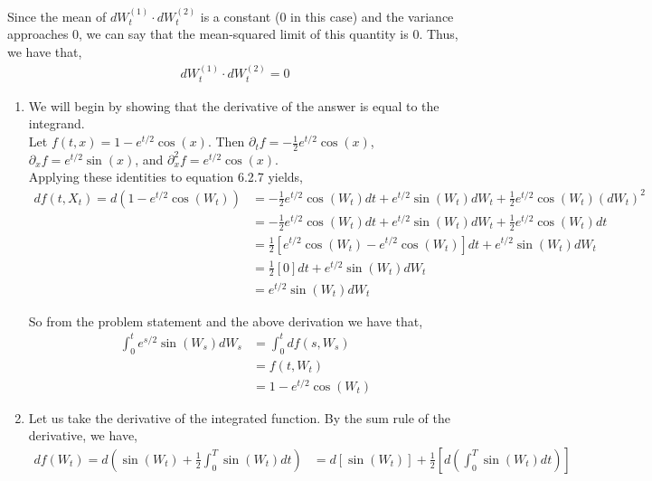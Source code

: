 \documentclass[12pt]{article}
\newenvironment{problem}[2][Problem]{\begin{trivlist}
\item[\hskip \labelsep {\bfseries #1}\hskip \labelsep {\bfseries #2.}]}{\end{trivlist}}
\begin{document}
Since the mean of $dW_t^{(1)} \cdot dW_t^{(2)}$ is a constant (0 in this case) and the variance approaches 0, we can say that the mean-squared limit of this quantity is 0. Thus, we have that,
\begin{align*}
dW_t^{(1)} \cdot dW_t^{(2)} = 0
\end{align*}

\begin{problem}{22}
\end{problem}

\begin{problem}{23}
\end{problem}

\begin{enumerate}[\alph*)]

\item We will begin by showing that the derivative of the answer is equal to the integrand.\\

Let $f(t,x) = 1 - e^{t/2}\cos(x)$. Then $\partial_t f = -\frac{1}{2}e^{t/2}\cos(x)$, $\partial_x f = e^{t/2}\sin(x)$, and $\partial^2_x f = e^{t/2}\cos(x)$.\\

Applying these identities to equation 6.2.7 yields,
\begin{align*}
df(t, X_t) = d(1 - e^{t/2}\cos(W_t)) &= -\frac{1}{2}e^{t/2}\cos(W_t)dt + e^{t/2}\sin(W_t)dW_t + \frac{1}{2}e^{t/2}\cos(W_t)(dW_t)^2\\
&= -\frac{1}{2}e^{t/2}\cos(W_t)dt + e^{t/2}\sin(W_t)dW_t + \frac{1}{2}e^{t/2}\cos(W_t)dt\\
&= \frac{1}{2}\left[e^{t/2}\cos(W_t) - e^{t/2}\cos(W_t)\right]dt + e^{t/2}\sin(W_t)dW_t\\
&= \frac{1}{2}[0]dt + e^{t/2}\sin(W_t)dW_t\\
&= e^{t/2}\sin(W_t)dW_t
\end{align*}

So from the problem statement and the above derivation we have that,
\begin{align*}
\int_0^t e^{s/2}\sin(W_s)dW_s &= \int_0^t df(s, W_s)\\
&= f(t, W_t)\\
&= 1 - e^{t/2}\cos(W_t)
\end{align*}

\item Let us take the derivative of the integrated function. By the sum rule of the derivative, we have,
\begin{align*}
d f(W_t) = d\left(\sin(W_t) + \frac{1}{2} \int_0^T \sin(W_t) dt\right) &= d\left[\sin(W_t)\right] + \frac{1}{2} \left[ d\left(\int_0^T \sin(W_t)dt\right) \right]\\
\end{align*}


\end{enumerate}
\end{document}
